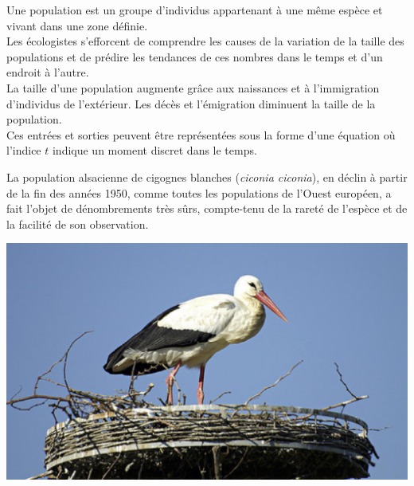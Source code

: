 \documentclass[a4paper,11pt,exos]{nsi} %
\begin{document}
\maketitle

Une population est un groupe d'individus appartenant à une même espèce et vivant dans une zone définie.\\
Les écologistes s'efforcent de comprendre les causes de la variation de la taille des populations et de prédire les tendances de ces nombres dans le temps et d'un endroit à l'autre.\\
La taille d'une population augmente grâce aux naissances et à l'immigration d'individus de l'extérieur. Les décès et l'émigration diminuent la taille de la population.\\
Ces entrées et sorties peuvent être représentées sous la forme d'une équation où l'indice $t$ indique un moment discret dans le temps.

\begin{center}
  \begin{minipage}[c]{.65\linewidth}
La population alsacienne de cigognes blanches (\emph{ciconia ciconia}), en déclin à partir de la fin des années 1950, comme toutes les populations de l'Ouest européen, a fait l'objet de dénombrements très sûrs, compte-tenu de la rareté de l'espèce et de la facilité de son
observation.
   \end{minipage} \hfill
   \begin{minipage}[c]{.3\linewidth}
\begin{center}
\includegraphics[scale=0.2]{cigogne.eps} 
\end{center}
   \end{minipage}
\end{center}
\end{document}
